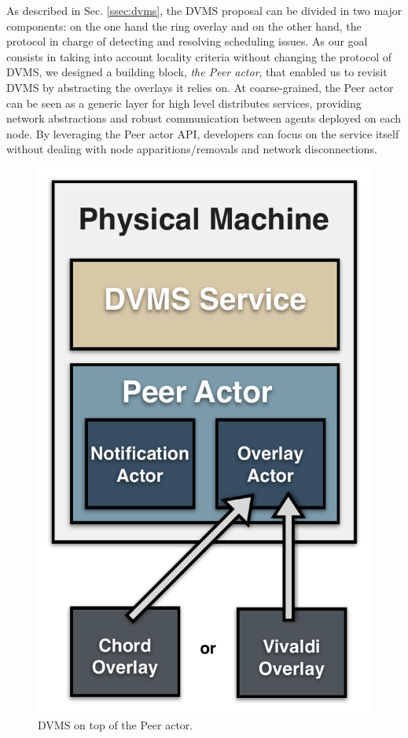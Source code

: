 As described in Sec. \ref{ssec:dvms}, the DVMS proposal can be divided in two major
components: on the one hand the ring overlay and on the other hand, the
protocol in charge of detecting and resolving scheduling issues.  As our goal
consists in taking into account locality criteria without changing the protocol
of DVMS, we designed a building block, \ie \emph{the Peer actor}, that enabled
us to revisit DVMS by abstracting the overlays it relies on.  At
coarse-grained, the Peer actor can be seen as a generic layer for high level
distributes services, providing network abstractions and robust communication
between agents deployed on each node.  By leveraging the Peer actor API,
developers can focus on the service itself without dealing with node
apparitions/removals and network disconnections. 

\begin{figure}
\vspace{-.7cm}\hspace*{.2cm}
  \includegraphics[width=\linewidth]{Figures/DVMS.pdf}
  \caption{DVMS on top of the Peer actor.}%
  \label{fig:peeractor}%
\end{figure}

